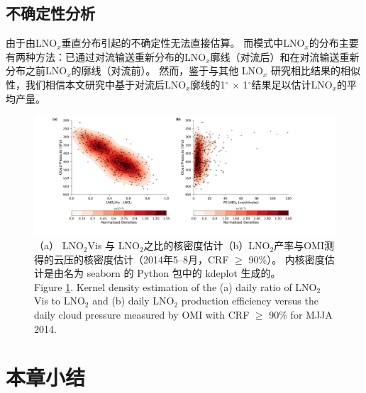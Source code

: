 \subsection{不确定性分析} \label{susbec:china_uncertainty}

由于由LNO$_x$垂直分布引起的不确定性无法直接估算。
而模式中LNO$_x$的分布主要有两种方法：已通过对流输送重新分布的LNO$_x$廓线（对流后）和在对流输送重新分布之前LNO$_x$的廓线（对流前）\citep{Allen.2012,Luo.2017}。
然而，鉴于与其他 LNO$_x$ 研究相比结果的相似性，我们相信本文研究中基于对流后LNO$_x$廓线的1$^{\circ}$ $\times$ 1$^{\circ}$结果足以估计LNO$_x$的平均产量。

\begin{figure}[t]
\includegraphics[width=15cm]{./figures/cp_ratio_lno2.pdf}
\caption{（a） LNO$_\textrm{2}$Vis 与 LNO$_\textrm{2}$之比的核密度估计（b）LNO$_\textrm{2}$产率与OMI测得的云压的核密度估计（2014年5--8月，CRF $\geq$ 90\%）。
内核密度估计是由名为 seaborn 的 Python 包中的 kdeplot 生成的。\\
Figure \ref{fig:cp_ratio_lno2}. Kernel density estimation of the (a) daily ratio of LNO$_\textrm{2}$Vis to LNO$_\textrm{2}$ and (b) daily LNO$_\textrm{2}$ production efficiency versus the daily cloud pressure measured by OMI with CRF $\geq$ 90\% for MJJA 2014.}
\label{fig:cp_ratio_lno2}
\end{figure}


\section{本章小结}

